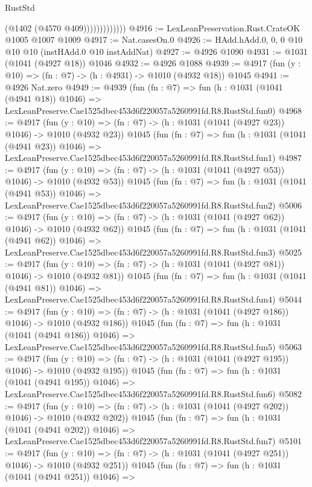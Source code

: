 \begin{lexlean}{RustStd}
\begin{coremodule}
                          (@1402 (@4570 @409)))))))))))))
@4916 := LexLeanPreservation.Rust.CrateOK @1005 @1007 @1009
@4917 := Nat.casesOn.{0}
@4926 := HAdd.hAdd.{0, 0, 0} @10 @10 @10 (instHAdd.{0} @10 instAddNat)
@4927 := @4926 @1090
@4931 := @1031 (@1041 (@4927 @18)) @1046
@4932 := @4926 @1088
@4939 := @4917 (fun (y : @10) => (fn : @7) -> (h : @4931) -> @1010 (@4932 @18)) @1045
@4941 := @4926 Nat.zero
@4949 := @4939
    (fun (fn : @7) =>
    fun (h : @1031 (@1041 (@4941 @18)) @1046) =>
    LexLeanPreserve.Cae1525dbec453d6f220057a5260991fd.R8.RustStd.fun0)
@4968 := @4917
    (fun (y : @10) => (fn : @7) -> (h : @1031 (@1041 (@4927 @23)) @1046) -> @1010 (@4932 @23))
    @1045
    (fun (fn : @7) =>
    fun (h : @1031 (@1041 (@4941 @23)) @1046) =>
    LexLeanPreserve.Cae1525dbec453d6f220057a5260991fd.R8.RustStd.fun1)
@4987 := @4917
    (fun (y : @10) => (fn : @7) -> (h : @1031 (@1041 (@4927 @53)) @1046) -> @1010 (@4932 @53))
    @1045
    (fun (fn : @7) =>
    fun (h : @1031 (@1041 (@4941 @53)) @1046) =>
    LexLeanPreserve.Cae1525dbec453d6f220057a5260991fd.R8.RustStd.fun2)
@5006 := @4917
    (fun (y : @10) => (fn : @7) -> (h : @1031 (@1041 (@4927 @62)) @1046) -> @1010 (@4932 @62))
    @1045
    (fun (fn : @7) =>
    fun (h : @1031 (@1041 (@4941 @62)) @1046) =>
    LexLeanPreserve.Cae1525dbec453d6f220057a5260991fd.R8.RustStd.fun3)
@5025 := @4917
    (fun (y : @10) => (fn : @7) -> (h : @1031 (@1041 (@4927 @81)) @1046) -> @1010 (@4932 @81))
    @1045
    (fun (fn : @7) =>
    fun (h : @1031 (@1041 (@4941 @81)) @1046) =>
    LexLeanPreserve.Cae1525dbec453d6f220057a5260991fd.R8.RustStd.fun4)
@5044 := @4917
    (fun (y : @10) => (fn : @7) -> (h : @1031 (@1041 (@4927 @186)) @1046) -> @1010 (@4932 @186))
    @1045
    (fun (fn : @7) =>
    fun (h : @1031 (@1041 (@4941 @186)) @1046) =>
    LexLeanPreserve.Cae1525dbec453d6f220057a5260991fd.R8.RustStd.fun5)
@5063 := @4917
    (fun (y : @10) => (fn : @7) -> (h : @1031 (@1041 (@4927 @195)) @1046) -> @1010 (@4932 @195))
    @1045
    (fun (fn : @7) =>
    fun (h : @1031 (@1041 (@4941 @195)) @1046) =>
    LexLeanPreserve.Cae1525dbec453d6f220057a5260991fd.R8.RustStd.fun6)
@5082 := @4917
    (fun (y : @10) => (fn : @7) -> (h : @1031 (@1041 (@4927 @202)) @1046) -> @1010 (@4932 @202))
    @1045
    (fun (fn : @7) =>
    fun (h : @1031 (@1041 (@4941 @202)) @1046) =>
    LexLeanPreserve.Cae1525dbec453d6f220057a5260991fd.R8.RustStd.fun7)
@5101 := @4917
    (fun (y : @10) => (fn : @7) -> (h : @1031 (@1041 (@4927 @251)) @1046) -> @1010 (@4932 @251))
    @1045
    (fun (fn : @7) =>
    fun (h : @1031 (@1041 (@4941 @251)) @1046) =>

\end{coremodule}
\end{lexlean}
